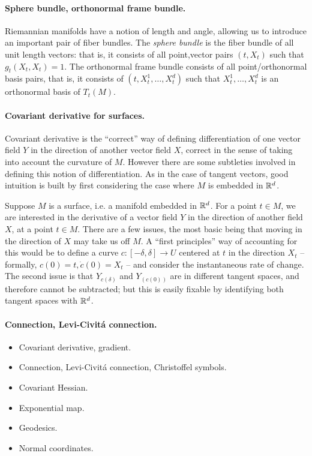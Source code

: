\documentclass{article}
\newcommand{\ag}[1]{{\bf{{\red{[{AG: #1}]}}}}}
\begin{document}
	\paragraph{Sphere bundle, orthonormal frame bundle.}
	Riemannian manifolds have a notion of length and angle, allowing us to introduce an important pair of fiber bundles. The \emph{sphere bundle} is the fiber bundle of all unit length vectors: that is, it consists of all point,vector pairs $(t,X_t)$ such that $g_t(X_t,X_t) = 1$.  The orthonormal frame bundle consists of all point/orthonormal basis pairs, that is, it consists of $(t,X_{t}^1,\ldots,X_{t}^d)$ such that $X_t^1,\ldots,X_t^d$ is an orthonormal basis of $T_t(M)$. 
	
	\paragraph{Covariant derivative for surfaces.}
	Covariant derivative is the ``correct'' way of defining differentiation of one vector field $Y$ in the direction of another vector field $X$, correct in the sense of taking into account the curvature of $M$. However there are some subtleties involved in defining this notion of differentiation. As in the case of tangent vectors, good intuition is built by first considering the case where $M$ is embedded in $\mathbb{R}^d$.
	
	Suppose $M$ is a surface, i.e. a manifold embedded in $\mathbb{R}^d$. For a point $t \in M$, we are interested in the derivative of a vector field $Y$ in the direction of another field $X$, at a point $t \in M$. There are a few issues, the most basic being that moving in the direction of $X$ may take us off $M$.  A ``first principles'' way of accounting for this would be to define a curve $c: [-\delta,\delta] \to U$ centered at $t$ in the direction $X_t$ -- formally, $c(0) = t, \dot{c}(0) = X_t$ -- and consider the instantaneous rate of change. The second issue is that $Y_{c(\delta)}$ and $Y_{(c(0))}$ are in different tangent spaces, and therefore cannot be subtracted; but this is easily fixable by identifying both tangent spaces with $\mathbb{R}^d$. 
	
	\paragraph{Connection, Levi-Civit\'{a} connection.}  
	
	\ag{TO COME}

	
	
	
	\begin{itemize}
		\item Covariant derivative, gradient.
		\item Connection,  Levi-Civit\'{a} connection, Christoffel symbols.
		\item Covariant Hessian.
		\item Exponential map.
		\item Geodesics.
		\item Normal coordinates.
	\end{itemize}
	
\end{document}
